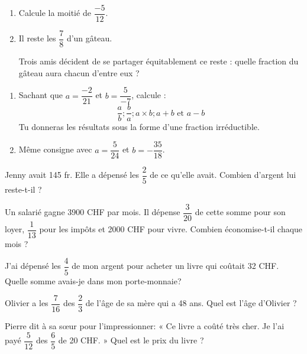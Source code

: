 \begin{exercice}[Partage]
\begin{enumerate}
\item Calcule la moitié de $\dfrac{-5}{12}$.
\item Il reste les $\dfrac{7}{8}$ d'un gâteau.

Trois amis décident de se partager équitablement ce reste : quelle fraction du gâteau aura chacun d'entre eux ?
\end{enumerate}
\end{exercice}


\begin{exercice}
\begin{enumerate}
\item Sachant que $a = \dfrac{-2}{21}$  et $b =\dfrac{5}{-7}$, calcule :
\[	\dfrac{a}{b} ; \dfrac{b}{a} ; a \times b ; a + b \text{ et } a - b\]
Tu donneras les résultats sous la forme d'une fraction irréductible.
\item Même consigne avec $a =\dfrac{5}{24}$  et $b =-\dfrac{35}{18}$.
\end{enumerate}
\end{exercice}


\begin{exercice}
Jenny avait 145 fr. Elle a dépensé les $\dfrac{2}{5}$ de ce qu'elle avait. Combien d’argent lui reste-t-il ?
\end{exercice}


\begin{exercice}
Un salarié gagne 3900 CHF par mois. Il dépense $\dfrac{3}{20}$ de cette somme pour son loyer, $\dfrac{1}{13}$ pour les impôts et 2000 CHF pour vivre. Combien économise-t-il chaque mois ?
\end{exercice}


\begin{exercice}
J'ai dépensé les $\dfrac{4}{5}$ de mon argent pour acheter un livre qui coûtait 32 CHF. Quelle somme avais-je dans mon porte-monnaie?
\end{exercice}


\begin{exercice}
Olivier a les $\dfrac{7}{16}$ des $\dfrac{2}{3}$ de l'âge de sa mère qui a 48 ans. Quel est l’âge d’Olivier ?
\end{exercice}


\begin{exercice}
Pierre dit à sa sœur pour l'impressionner: « Ce livre a coûté très cher. Je l'ai payé $\dfrac{5}{12}$ des $\dfrac{6}{5}$ de 20 CHF. » Quel est le prix du livre ?
\end{exercice}


